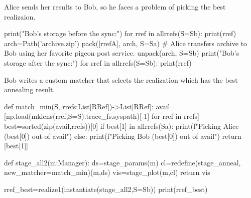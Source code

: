 Alice sends her results to Bob, so he faces a problem of picking the best
realizaion.

\begin{pythontexcode}
print("Bob's storage before the sync:")
for rref in allrrefs(S=Sb):
  print(rref)
arch=Path('archive.zip')
pack([rrefA], arch, S=Sa)
# Alice transfers archive to Bob using her favorite pigeon post service.
unpack(arch, S=Sb)
print("Bob's storage after the sync:")
for rref in allrrefs(S=Sb):
  print(rref)
\end{pythontexcode}

\mystdout


Bob writes a custom matcher that selects the realization which has the best
annealing result.

\begin{pythontexcode}
def match_min(S, rrefs:List[RRef])->List[RRef]:
  avail=[np.load(mklens(rref,S=S).trace_fs.syspath)[-1] for rref in rrefs]
  best=sorted(zip(avail,rrefs))[0]
  if best[1] in allrrefs(Sa):
    print(f"Picking Alice ({best[0]}) out of {avail}")
  else:
    print(f"Picking Bob ({best[0]}) out of {avail}")
  return [best[1]]

def stage_all2(m:Manager):
  ds=stage_params(m)
  cl=redefine(stage_anneal, new_matcher=match_min)(m,ds)
  vis=stage_plot(m,cl)
  return vis

rref_best=realize1(instantiate(stage_all2,S=Sb))
print(rref_best)
\end{pythontexcode}

\mystdout
